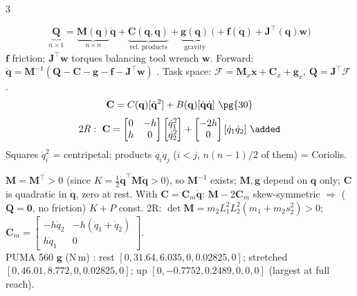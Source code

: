 \begin{multicols}{3}
\begin{fbx}
\[\underbrace{\mathbf Q}_{n\times1}=\underbrace{\mathbf M(\mathbf q)}_{n\times n}\ddot{\mathbf q}+\underbrace{\mathbf C(\mathbf q,\dot{\mathbf q})}_{\text{vel.\ products}}+\underbrace{\mathbf g(\mathbf q)}_{\text{gravity}}\ \big(+\mathbf f(\dot{\mathbf q})+\mathbf J^\top(\mathbf q)\mathbf w\big)\]
$\mathbf f$ friction; $\mathbf J^\top\mathbf w$ torques balancing tool wrench $\mathbf w$. Forward: $\ddot{\mathbf q}=\mathbf M^{-1}(\mathbf Q-\mathbf C-\mathbf g-\mathbf f-\mathbf J^\top\mathbf w)$ . Task space: $\boldsymbol{\mathcal F}=\mathbf M_x\ddot{\mathbf x}+\mathbf C_x+\mathbf g_x$, $\mathbf Q=\mathbf J^\top\boldsymbol{\mathcal F}$ .
\[\mathbf C=C(\mathbf q)[\dot{\mathbf q}^2]+B(\mathbf q)[\dot{\mathbf q}\dot{\mathbf q}]\ \pg{30}\]
\[2R:\ \mathbf C=\begin{bmatrix}0&-h\\h&0\end{bmatrix}\begin{bmatrix}\dot q_1^2\\\dot q_2^2\end{bmatrix}+\begin{bmatrix}-2h\\0\end{bmatrix}[\dot q_1\dot q_2]\ \added\]
Squares $\dot q_i^2$ = centripetal; products $\dot q_i\dot q_j$ ($i<j$, $n(n{-}1)/2$ of them) = Coriolis.
\end{fbx}
\begin{fbx}
$\mathbf M=\mathbf M^\top>0$ (since $K=\tfrac12\dot{\mathbf q}^\top\mathbf M\dot{\mathbf q}>0$), so $\mathbf M^{-1}$ exists; $\mathbf M,\mathbf g$ depend on $\mathbf q$ only; $\mathbf C$ is quadratic in $\dot{\mathbf q}$, zero at rest. With $\mathbf C=\mathbf C_m\dot{\mathbf q}$: $\dot{\mathbf M}-2\mathbf C_m$ skew-symmetric $\Rightarrow$ ($\mathbf Q=\mathbf 0$, no friction) $K+P$ const. 2R: $\det\mathbf M=m_2L_1^2L_2^2(m_1+m_2s_2^2)>0$; $\mathbf C_m=\begin{bmatrix}-h\dot q_2&-h(\dot q_1{+}\dot q_2)\\h\dot q_1&0\end{bmatrix}$. \chk\\
PUMA 560 $\mathbf g$ (N\,m) : rest $[0,31.64,6.035,0,0.02825,0]$; stretched $[0,46.01,8.772,0,0.02825,0]$; up $[0,-0.7752,0.2489,0,0,0]$ (largest at full reach).
\end{fbx}


\end{multicols}

